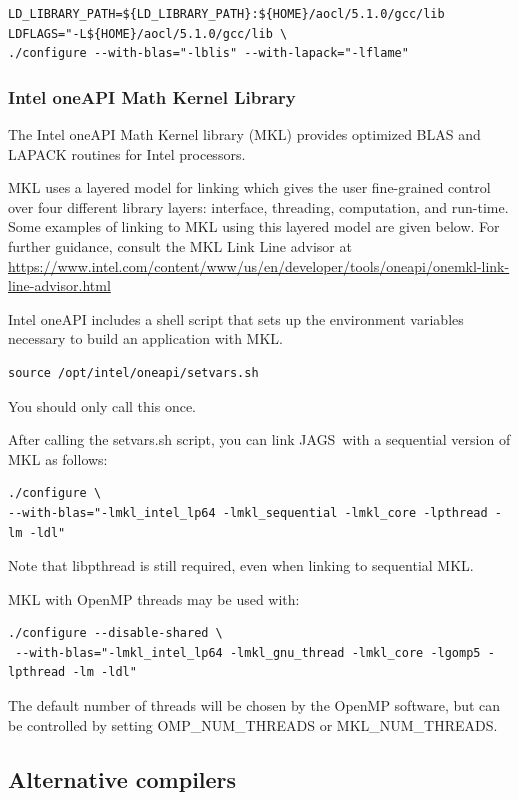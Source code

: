 \documentclass[11pt, a4paper, titlepage]{article}
\newcommand{\JAGS}{\textsf{JAGS}}
\newcommand{\code}[1]{{\bgroup{\normalfont\ttfamily #1}\egroup}}
\begin{document}
\begin{verbatim}
LD_LIBRARY_PATH=${LD_LIBRARY_PATH}:${HOME}/aocl/5.1.0/gcc/lib
LDFLAGS="-L${HOME}/aocl/5.1.0/gcc/lib \
./configure --with-blas="-lblis" --with-lapack="-lflame"
\end{verbatim}

\subsubsection{Intel oneAPI Math Kernel Library}

The Intel oneAPI Math Kernel library (MKL) provides optimized BLAS and
LAPACK routines for Intel processors.

MKL uses a layered model for linking which gives the user fine-grained
control over four different library layers: interface, threading,
computation, and run-time. Some examples of linking to MKL using this
layered model are given below. For further guidance, consult the MKL
Link Line advisor at
\url{https://www.intel.com/content/www/us/en/developer/tools/oneapi/onemkl-link-line-advisor.html}

Intel oneAPI includes a shell script that sets up the environment variables
necessary to build an application with MKL.
\begin{verbatim}
source /opt/intel/oneapi/setvars.sh
\end{verbatim}
You should only call this once.

After calling the \code{setvars.sh} script, you can link \JAGS\ with a
sequential version of MKL as follows:
\begin{verbatim}
./configure \
--with-blas="-lmkl_intel_lp64 -lmkl_sequential -lmkl_core -lpthread -lm -ldl"
\end{verbatim}
Note that \code{libpthread} is still required, even when linking
to sequential MKL.

MKL with OpenMP threads may be used with:
\begin{verbatim}
./configure --disable-shared \
 --with-blas="-lmkl_intel_lp64 -lmkl_gnu_thread -lmkl_core -lgomp5 -lpthread -lm -ldl"
\end{verbatim}
The default number of threads will be chosen by the OpenMP software,
but can be controlled by setting \code{OMP\_NUM\_THREADS} or
\code{MKL\_NUM\_THREADS}.

\subsection{Alternative compilers}
\end{document}
